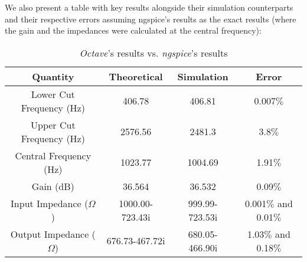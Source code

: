 We also present a table with key results alongside their simulation counterparts and their respective errors assuming ngspice's results as the exact results (where the gain and the impedances were calculated at the central frequency):

\begin{center}
    \begin{table}[H]
        \centering
        \begin{tabular}{c|c|c|c}
          \textbf{Quantity} & \textbf{Theoretical}  & \textbf{Simulation} & \textbf{Error}\\
          \hline

            Lower Cut Frequency (Hz) &  406.78 &  406.81 & 0.007$\%$ \\
            Upper Cut Frequency (Hz)&  2576.56 &  2481.3 & 3.8$\%$ \\
            Central Frequency (Hz)& 1023.77 &  1004.69 & 1.91$\%$  \\
            Gain (dB) &  36.564  & 36.532 & 0.09$\%$ \\
            Input Impedance ($\Omega$) & 1000.00-723.43i & 999.99-723.53i & 0.001$\%$ and 0.01$\%$\\
            Output Impedance ($\Omega$) & 676.73-467.72i & 680.05-466.90i & 1.03$\%$ and 0.18$\%$\\
        \end{tabular}
        \caption{\textit{Octave}'s results vs. \textit{ngspice}'s results}
    \end{table}
\end{center}

